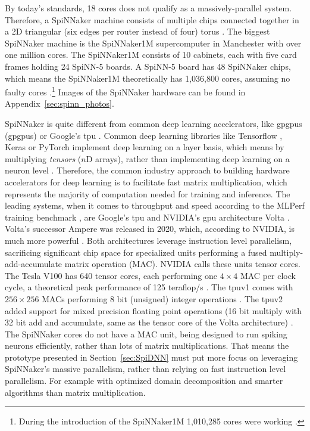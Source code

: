 \documentclass[]{article}
\begin{document}
By today's standards, 18 cores does not qualify as a massively-parallel
system.
Therefore, a SpiNNaker machine consists of multiple chips connected
together in a 2D triangular (six edges per router instead of four)
torus \citep{furber_et_al_2020}.
The biggest SpiNNaker machine is the SpiNNaker1M supercomputer in
Manchester with over one million cores.
The SpiNNaker1M consists of 10 cabinets, each with five card frames
holding 24 SpiNN-5 boards.
A SpiNN-5 board has 48 SpiNNaker chips, which means the SpiNNaker1M
theoretically has 1,036,800 cores, assuming no faulty cores
\citep{furber_et_al_2020}.\footnote{During the introduction of the
  SpiNNaker1M 1,010,285 cores were working \citep{uoecompsci_2019}.}
Images of the SpiNNaker hardware can be found in
Appendix~\ref{sec:spinn_photos}.

SpiNNaker is quite different from common deep learning accelerators,
like \acrlong{gpgpu}s (\acrshort{gpgpu}s) or Google's
\acrshort{tpu} \citep{jouppi_et_al_2017}.
Common deep learning libraries like Tensorflow
\citep{abadi_et_al_2015}, Keras \citep{keras} or PyTorch
\citep{paszke_et_al_2019} implement
deep learning on a layer basis, which means by multiplying
\textit{tensors} ($n$D arrays), rather than implementing deep learning
on a neuron level \citep{goodfellow_et_al_2016}.
Therefore, the common industry approach to building hardware
accelerators for deep learning is to facilitate fast matrix
multiplication, which represents the majority of computation needed
for training and inference.
The leading systems, when it comes to throughput and speed according
to the MLPerf training benchmark \citep{mlperf_2019}, are Google's
\acrshort{tpu} \citep{jouppi_et_al_2017} and NVIDIA's \acrshort{gpu}
architecture Volta \citep{durant_et_al_2017}.
Volta's successor Ampere was released in 2020, which, according to
NVIDIA, is much more powerful \citep{krashinsky_et_al_2020}.
Both architectures leverage instruction level parallelism, sacrificing
significant chip space for specialized units performing a
fused multiply-add-accumulate matrix operation (MAC).
NVIDIA calls these units tensor cores. The Tesla V100 has 640 tensor
cores, each performing one $4\times 4$ MAC per clock cycle, a
theoretical peak performance of 125 teraflop/s
\citep{markidis_et_al_2018}.
The \acrshort{tpu}v1 comes with $256\times256$ MACs performing 8 bit
(unsigned) integer operations \citep{jouppi_et_al_2017}.
The \acrshort{tpu}v2 added support for mixed precision floating point
operations (16 bit multiply with 32 bit add and accumulate, same as
the tensor core of the Volta architecture)
\citep{kennedy_2017, markidis_et_al_2018}.
The SpiNNaker cores do not have a MAC unit, being designed to run
spiking neurons efficiently, rather than lots of matrix
multiplications.
That means the prototype presented in Section~\ref{sec:SpiDNN} must
put more focus on leveraging SpiNNaker's massive parallelism, rather
than relying on fast instruction level parallelism.
For example with optimized domain decomposition and smarter algorithms
than matrix multiplication.
\end{document}

